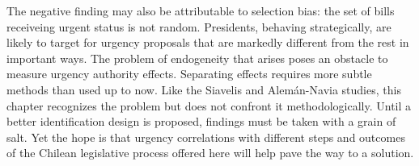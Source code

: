 \documentclass[letter,12pt]{article}
\begin{document}

The negative finding may also be attributable to selection bias: the set of bills receiveing urgent status is not random. Presidents, behaving strategically, are likely to target for urgency proposals that are markedly different from the rest in important ways. The problem of endogeneity that arises poses an obstacle to measure urgency authority effects. Separating effects requires more subtle methods than used up to now. Like the Siavelis and Alem\'an-Navia studies, this chapter recognizes the problem but does not confront it methodologically. Until a better identification design is proposed, findings must be taken with a grain of salt. Yet the hope is that urgency correlations with different steps and outcomes of the Chilean legislative process offered here will help pave the way to a solution. 

\end{document}
